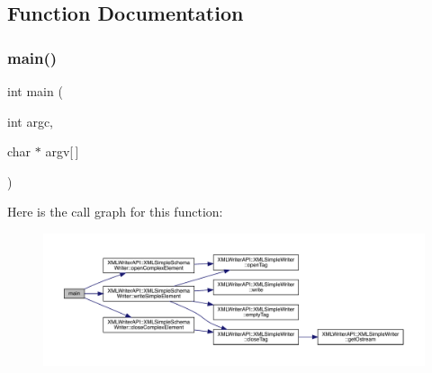 \subsection{Function Documentation}
\mbox{\label{adat-devel_2other__libs_2xpath__reader_2examples_2simple__schema__writer__test_8cc_a0ddf1224851353fc92bfbff6f499fa97}} 
\subsubsection{\texorpdfstring{main()}{main()}}
{\footnotesize\ttfamily int main (\begin{DoxyParamCaption}\item[{int}]{argc,  }\item[{char $\ast$}]{argv\mbox{[}$\,$\mbox{]} }\end{DoxyParamCaption})}

Here is the call graph for this function\+:
\nopagebreak
\begin{figure}[H]
\begin{center}
\leavevmode
\includegraphics[width=350pt]{da/d1b/adat-devel_2other__libs_2xpath__reader_2examples_2simple__schema__writer__test_8cc_a0ddf1224851353fc92bfbff6f499fa97_cgraph}
\end{center}
\end{figure}
